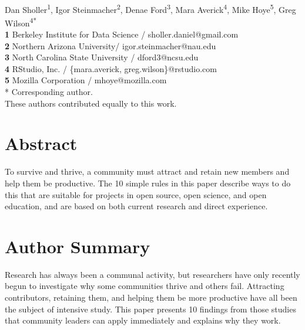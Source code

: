 \documentclass[10pt,letterpaper]{article}
\begin{document}
\vspace*{0.2in}

\begin{flushleft}
{\Large
\textbf{}
}
\newline
\\
{Dan Sholler}\textsuperscript{1{\ddag}},
{Igor Steinmacher}\textsuperscript{2{\ddag}},
{Denae Ford}\textsuperscript{3{\ddag}},
{Mara Averick}\textsuperscript{4{\ddag}},
{Mike Hoye}\textsuperscript{5{\ddag}},
{Greg Wilson}\textsuperscript{4{\ddag}*}
\\
\bigskip
\textbf{1} Berkeley Institute for Data Science / sholler.daniel@gmail.com \\
\textbf{2} Northern Arizona University/ igor.steinmacher@nau.edu \\
\textbf{3} North Carolina State University / dford3@ncsu.edu \\
\textbf{4} RStudio, Inc. / \{mara.averick, greg.wilson\}@rstudio.com \\
\textbf{5} Mozilla Corporation / mhoye@mozilla.com \\
* Corresponding author. \\
\bigskip
{\ddag} These authors contributed equally to this work.
\end{flushleft}

\section*{Abstract}

To survive and thrive,
a community must attract and retain new members
and help them be productive.
The 10 simple rules in this paper describe ways to do this
that are suitable for projects in open source, open science, and open education,
and are based on both current research and direct experience.

\section*{Author Summary}

Research has always been a communal activity,
but researchers have only recently begun to investigate why some communities thrive and others fail.
Attracting contributors,
retaining them,
and helping them be more productive
have all been the subject of intensive study.
This paper presents 10 findings from those studies that community leaders can apply immediately
and explains why they work.
\end{document}
